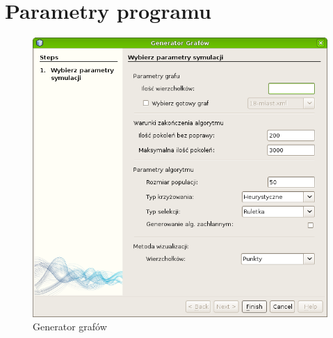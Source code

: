 \documentclass[a4paper]{article}
\begin{document}
\section{Parametry programu}
\begin{figure}[phb]
 \centering
 \includegraphics[width=\textwidth ]{wizard.png}
 \caption{Generator grafów}
\end{figure}
\end{document}
